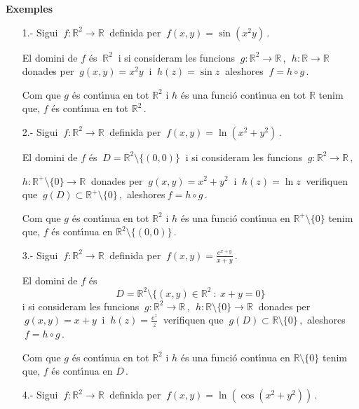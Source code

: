 \documentclass[12pt]{article}
\newcommand{\exemples}{\textbf{Exemples}\ \ }
\newcommand{\R}{\mathbb{R}}
\begin{document}
\vspace{0.4cm}
\exemples
\begin{itemize}
  \item[1.-] Sigui $\ f:\R^2\longrightarrow\R\ $ definida per $\ f(x,y)=\sin (x^2y)\,. $

  El domini de $f$ {\'e}s $\ \R^2\ $ i si consideram les funcions
  $\ g:\R^2\longrightarrow\R\,,\ \  h:\R\longrightarrow\R\ $ donades per $\ g(x,y)= x^2 y\ $  i
  $\ h(z)=\sin z\ $ aleshores  $\ f=h\circ g\,.$

Com que $g$ {\'e}s cont{\'\i}nua en tot $\R^2$ i $h$ {\'e}s
  una funci{\'o} cont{\'\i}nua en tot $\R$ tenim que, $f$ {\'e}s
  cont{\'\i}nua en tot $\R^2\,.$

\vspace{0.3cm}
  \item[2.-] Sigui $\ f:\R^2\longrightarrow\R\ $ definida per $\ f(x,y)=\ln (x^2+y^2)\,. $

  El domini de $f$ {\'e}s $\ D=\R^2\setminus\{ (0,0) \}\ $ i si consideram les funcions
  $\ g:\R^2\longrightarrow\R\,,$

  $h:\R^+\setminus\{0 \}\longrightarrow\R\ $ donades per $\ g(x,y)= x^2 +y^2\ $  i
  $\ h(z)=\ln z\ $ verifiquen que   $\ g(D)\subset \R^+\setminus\{0 \}\,, $ aleshores$\ f=h\circ g\,.$

Com que $g$ {\'e}s cont{\'\i}nua en tot $\R^2$ i $h$ {\'e}s
  una funci{\'o} cont{\'\i}nua en $\R^+\setminus \{ 0\}$ tenim que, $f$ {\'e}s
  cont{\'\i}nua en $\R^2\setminus\{ (0,0) \}\,.$



\vspace{0.3cm}
  \item[3.-] Sigui $\ f:\R^2\longrightarrow\R\ $ definida per $\ f(x,y)=\displaystyle\frac{e^{x+y}}{x+y}\,. $

  El domini de $f$ {\'e}s
  $$D=\R^2\setminus\{(x,y)\in\R^2\ :\  x+y=0 \}$$
   i si consideram les funcions
  $\ g:\R^2\longrightarrow\R\,,\ \ h:\R\setminus\{0 \}\longrightarrow\R\ $ donades per $\ g(x,y)=x +y\ $  i
  $\ h(z)=\frac{e^z}{z}\ $ verifiquen que   $\ g(D)\subset \R\setminus\{0 \}\,, $ aleshores$\ f=h\circ g\,.$

Com que $g$ {\'e}s cont{\'\i}nua en tot $\R^2$ i $h$ {\'e}s
  una funci{\'o} cont{\'\i}nua en $\R\setminus \{ 0\}$ tenim que, $f$ {\'e}s
  cont{\'\i}nua en $D\,.$


\vspace{0.3cm}
  \item[4.-] Sigui $\ f:\R^2\longrightarrow\R\ $ definida per $\ f(x,y)=\ln (\cos (x^2+y^2))\,. $


\end{itemize}
\end{document}
